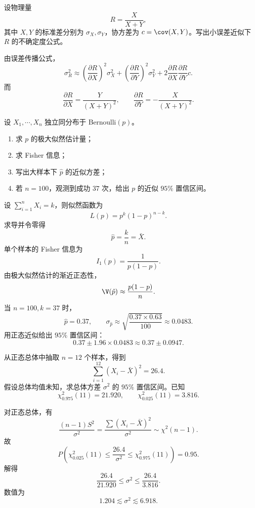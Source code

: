 ﻿

\begin{question}
设物理量
\[
R=\frac{X}{X+Y},
\]
其中 $X,Y$ 的标准差分别为 $\sigma_X,\sigma_Y$，协方差为 $c=\cov(X,Y)$。写出小误差近似下 $R$ 的不确定度公式。
\begin{solution}
由误差传播公式，
\[
\sigma_R^2\approx
\left(\frac{\partial R}{\partial X}\right)^2\sigma_X^2+
\left(\frac{\partial R}{\partial Y}\right)^2\sigma_Y^2+
2\frac{\partial R}{\partial X}\frac{\partial R}{\partial Y}c.
\]
而
\[
\frac{\partial R}{\partial X}=\frac{Y}{(X+Y)^2},
\qquad
\frac{\partial R}{\partial Y}=-\frac{X}{(X+Y)^2}.
\]
\end{solution}
\end{question}

\begin{question}
设 $X_1,\cdots,X_n$ 独立同分布于 Bernoulli$(p)$。
\begin{enumerate}
\item 求 $p$ 的极大似然估计量；
\item 求 Fisher 信息；
\item 写出大样本下 $\hat p$ 的近似方差；
\item 若 $n=100$，观测到成功 $37$ 次，给出 $p$ 的近似 $95\%$ 置信区间。
\end{enumerate}
\begin{solution}
设 $\sum_{i=1}^n X_i=k$，则似然函数为
\[
L(p)=p^k(1-p)^{n-k}.
\]
求导并令零得
\[
\hat p=\frac{k}{n}=\bar X.
\]
单个样本的 Fisher 信息为
\[
I_1(p)=\frac{1}{p(1-p)}.
\]
由极大似然估计的渐近正态性，
\[
\V(\hat p)\approx \frac{p(1-p)}{n}.
\]
当 $n=100,k=37$ 时，
\[
\hat p=0.37,
\qquad
\sigma_{\hat p}\approx \sqrt{\frac{0.37\times 0.63}{100}}\approx 0.0483.
\]
用正态近似给出 $95\%$ 置信区间：
\[
0.37\pm 1.96\times 0.0483
\approx 0.37\pm 0.0947.
\]
\end{solution}
\end{question}

\begin{question}
从正态总体中抽取 $n=12$ 个样本，得到
\[
\sum_{i=1}^{12}(X_i-\bar X)^2=26.4.
\]
假设总体均值未知，求总体方差 $\sigma^2$ 的 $95\%$ 置信区间。已知
\[
\chi^2_{0.975}(11)=21.920,
\qquad
\chi^2_{0.025}(11)=3.816.
\]
\begin{solution}
对正态总体，有
\[
\frac{(n-1)S^2}{\sigma^2}=\frac{\sum (X_i-\bar X)^2}{\sigma^2}\sim \chi^2(n-1).
\]
故
\[
P\left(\chi^2_{0.025}(11)\le \frac{26.4}{\sigma^2}\le \chi^2_{0.975}(11)\right)=0.95.
\]
解得
\[
\frac{26.4}{21.920}\le \sigma^2\le \frac{26.4}{3.816}.
\]
数值为
\[
1.204\lesssim \sigma^2\lesssim 6.918.
\]
\end{solution}
\end{question}

